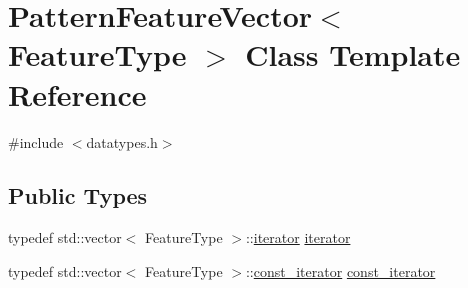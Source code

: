 \hypertarget{classPatternFeatureVector}{}\section{Pattern\+Feature\+Vector$<$ Feature\+Type $>$ Class Template Reference}
\label{classPatternFeatureVector}


{\ttfamily \#include $<$datatypes.\+h$>$}

\subsection*{Public Types}
\begin{DoxyCompactItemize}
\item 
typedef std\+::vector$<$ Feature\+Type $>$\+::\hyperlink{classPatternFeatureVector_a4a2652f25b1f733630a6d1b8479fce77}{iterator} \hyperlink{classPatternFeatureVector_a4a2652f25b1f733630a6d1b8479fce77}{iterator}
\item 
typedef std\+::vector$<$ Feature\+Type $>$\+::\hyperlink{classPatternFeatureVector_a8fae8bc79a755c241964080a684cfd43}{const\+\_\+iterator} \hyperlink{classPatternFeatureVector_a8fae8bc79a755c241964080a684cfd43}{const\+\_\+iterator}
\end{DoxyCompactItemize}

